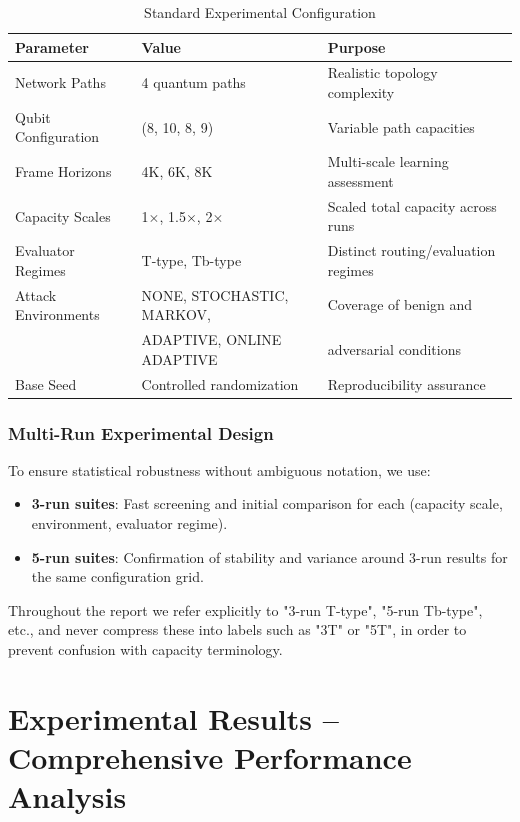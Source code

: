 \documentclass[12pt,a4paper]{article}
\begin{document}
\begin{table}[H]
\centering
\caption{Standard Experimental Configuration}
\begin{tabular}{|l|l|l|}
\hline
\textbf{Parameter} & \textbf{Value} & \textbf{Purpose} \\
\hline
\hline
Network Paths & 4 quantum paths & Realistic topology complexity \\
Qubit Configuration & (8, 10, 8, 9) & Variable path capacities \\
Frame Horizons & 4K, 6K, 8K & Multi-scale learning assessment \\
Capacity Scales & 1$\times$, 1.5$\times$, 2$\times$ & Scaled total capacity across runs \\
Evaluator Regimes & T-type, Tb-type & Distinct routing/evaluation regimes \\
Attack Environments & NONE, STOCHASTIC, MARKOV, & Coverage of benign and \\
 & ADAPTIVE, ONLINE ADAPTIVE & adversarial conditions \\
Base Seed & Controlled randomization & Reproducibility assurance \\
\hline
\end{tabular}
\end{table}

\subsubsection{Multi-Run Experimental Design}

To ensure statistical robustness without ambiguous notation, we use:

\begin{itemize}
\item \textbf{3-run suites}: Fast screening and initial comparison for each (capacity scale, environment, evaluator regime).
\item \textbf{5-run suites}: Confirmation of stability and variance around 3-run results for the same configuration grid.
\end{itemize}

Throughout the report we refer explicitly to "3-run T-type", "5-run Tb-type", etc., and never compress these into labels such as "3T" or "5T", in order to prevent confusion with capacity terminology.

\newpage
\section{Experimental Results – Comprehensive Performance Analysis}
\end{document}

